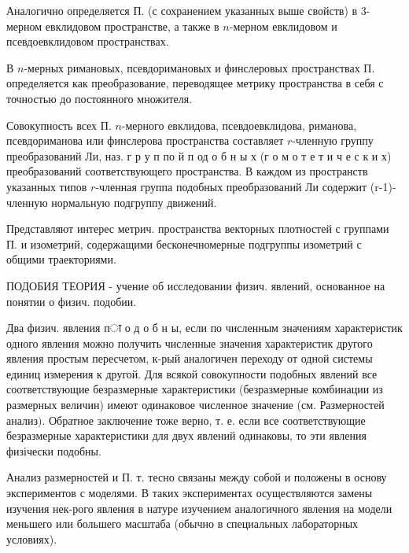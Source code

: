 \documentclass[10pt]{article}
\begin{document}
Аналогично определяется П. (с сохранением указанных выше свойств) в 3-мерном евклидовом пространстве, а также в $n$-мерном евклидовом и псевдоевклидовом пространствах.



В $n$-мерных римановых, псевдоримановых и финслеровых пространствах П. определяется как преобразование, переводящее метрику пространства в себя с точностью до постоянного множителя.



Совокупность всех П. $n$-мерного евклидова, псевдоевклидова, риманова, псевдориманова или финслерова пространства составляет $r$-членную группу преобразований Ли, наз. г р у п по й п од о б н ы х (г о м о т е т и ч е с к и х) преобразований соответствующего пространства. В каждом из пространств указанных типов $r$-членная группа подобных преобразований Ли содержит (r-1)-членную нормальную подгруппу движений.



Представляют интерес метрич. пространства векторных плотностей с группами П. и изометрий, содержащими бесконечномерные подгруппы изометрий с общими траекториями.



ПОДОБИЯ ТЕОРИЯ - учение об исследовании физич. явлений, основанное на понятии о физич. подобии.



Два физич. явления пा о д о б н ы, если по численным значениям характеристик одного явления можно получить численные значения характеристик другого явления простым пересчетом, к-рый аналогичен переходу от одной системы единиц измерения к другой. Для всякой совокупности подобных явлений все соответствующие безразмерные характеристики (безразмерные комбинации из размерных величин) имеют одинаковое численное значение (см. Размерностей ана$л и з)$. Обратное заключение тоже верно, т. е. если все соответствующие безразмерные характеристики для двух явлений одинаковы, то эти явления физічески подобны.



Анализ размерностей и П. т. тесно связаны между собой и положены в основу экспериментов с моделями. В таких экспериментах осуществляются замены изучения нек-рого явления в натуре изучением аналогичного явления на модели меньшего или большего масштаба (обычно в специальных лабораторных условиях).
\end{document}
